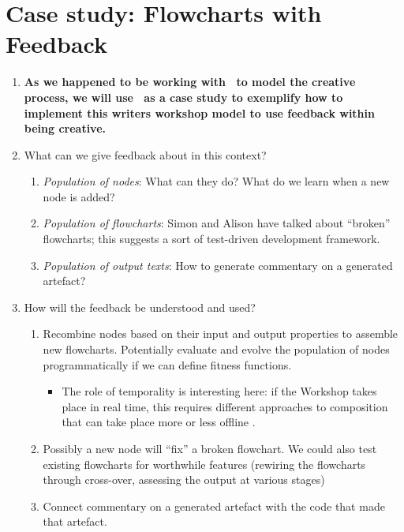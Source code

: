 \section{Case study: Flowcharts with Feedback}

\begin{enumerate}[start=3]
\item \textbf{As we happened to be working with \Fw\ to model the
  creative process, we will use \Fw\ as a case study to exemplify how
  to implement this writers workshop model to use feedback within
  being creative.}
\item[] What can we give feedback about in this context?
\begin{enumerate}
\item \emph{Population of nodes}: What can they do?  What do we learn when a
  new node is added?
\item \emph{Population of flowcharts}: Simon and Alison have talked
  about ``broken'' flowcharts; this suggests a sort of test-driven
  development framework.
\item \emph{Population of output texts}: How to generate commentary on
  a generated artefact?
\end{enumerate}
\item[] How will the feedback be understood and used?
\begin{enumerate}
\item Recombine nodes based on their input and output properties to
  assemble new flowcharts.  Potentially evaluate and evolve the
  population of nodes programmatically if we can define fitness
  functions.
\begin{itemize}
\item The role of temporality is interesting here: if the Workshop
  takes place in real time, this requires different approaches to
  composition that can take place more or less offline \cite{perez2013rolling}.
\end{itemize}
\item Possibly a new node will ``fix'' a broken flowchart.  We could also test existing flowcharts for worthwhile features (rewiring the flowcharts through cross-over, assessing the output at various stages)
\item Connect commentary on a generated artefact with the code that
  made that artefact.
\end{enumerate}
\end{enumerate}

